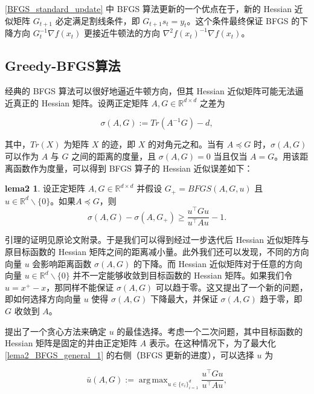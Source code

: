 \documentclass[a4paper,twoside,AutoFakeBold]{article}
\theoremstyle{definition}
\newtheorem{lema2}{{lema2}}
\DeclareMathOperator*{\argmax}{arg\,max}
\begin{document}
\eqref{BFGS_standard_update} 中 BFGS 算法更新的一个优点在于，新的 Hessian 近似矩阵 $G_{t+1}$ 必定满足割线条件，即 $G_{t+1}s_t = y_t$。这个条件最终保证 BFGS 的下降方向 $G_t^{-1}\nabla f(x_t)$ 更接近牛顿法的方向 $\nabla^2 f(x_t)^{-1}\nabla f(x_t)$。

\subsection{Greedy-BFGS算法}\label{section:greedy_BFGS}

经典的 BFGS 算法可以很好地逼近牛顿方向，但其 Hessian 近似矩阵可能无法逼近真正的 Hessian 矩阵。设两正定矩阵 $A,G\in \mathbb{R}^{d \times d}$ 之差为

\begin{equation}\label{sigma}
    \sigma(A, G) := Tr(A^{-1}G) - d,
\end{equation}

其中，$Tr(X)$ 为矩阵 $X$ 的迹，即 $X$ 的对角元之和。当有 $A \preceq G$ 时，$\sigma(A, G)$ 可以作为 $A$ 与 $G$ 之间的距离的度量，且 $\sigma(A, G) = 0$ 当且仅当 $A = G$。用该距离函数作为度量，可以得到 BFGS 算子的 Hessian 近似误差如下：

\begin{lema2}\label{lema2_BFGS_general}
    设正定矩阵 $A, G \in \mathbb{R}^{d \times d}$ 并假设 $G_{+} = BFGS(A, G, u)$ 且 $u \in \mathbb{R}^d\backslash\{0\}$。如果$A \preceq G$，则
    \begin{equation}\label{lema2_BFGS_general_1}
        \sigma(A, G) - \sigma(A, G_+) \geq \frac{u^\top G u}{u^\top A u}-1.
    \end{equation}
\end{lema2}

引理的证明见原论文附录。于是我们可以得到经过一步迭代后 Hessian 近似矩阵与原目标函数的 Hessian 矩阵之间的距离减小量。此外我们还可以发现，不同的方向向量 $u$ 会影响距离函数 $\sigma(A, G)$ 的下降。而 Hessian 近似矩阵对于任意的方向向量 $u \in \mathbb{R}^{d}\backslash\{0\}$ 并不一定能够收敛到目标函数的 Hessian 矩阵。如果我们令 $u=x^+-x$，那同样不能保证 $\sigma(A, G)$ 可以趋于零。这又提出了一个新的问题，即如何选择方向向量 $u$ 使得 $\sigma(A, G)$ 下降最大，并保证 $\sigma(A, G)$ 趋于零，即 $G$ 收敛到 $A$。

\citet{rodomanov2020greedy} 提出了一个贪心方法来确定 $u$ 的最佳选择。考虑一个二次问题，其中目标函数的 Hessian 矩阵是固定的并由正定矩阵 $A$ 表示。在这种情况下，为了最大化 \eqref{lema2_BFGS_general_1} 的右侧（BFGS 更新的进度），可以选择 $u$ 为

\begin{equation}\label{greedy_vector}
    \bar{u}(A, G) := \argmax_{u \in \{e_i\}_{i = 1}^{d}} \frac{u^\top G u}{u^\top A u},
\end{equation}
\end{document}
